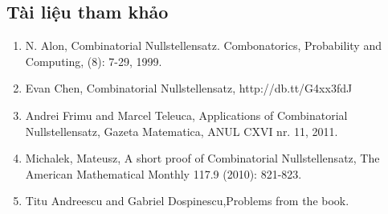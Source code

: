 \subsection*{Tài liệu tham khảo}
\begin{enumerate}[1.]
\item N. Alon, Combinatorial Nullstellensatz. Combonatorics, Probability and Computing, (8): 7-29, 1999.
\item Evan Chen, Combinatorial Nullstellensatz, http://db.tt/G4xx3fdJ
\item Andrei Frimu and Marcel Teleuca, Applications of Combinatorial Nullstellensatz, Gazeta Matematica, ANUL CXVI nr. 11, 2011.
\item Michalek, Mateusz, A short proof of Combinatorial Nullstellensatz, The American Mathematical Monthly 117.9 (2010): 821-823.
\item Titu Andreescu and Gabriel Dospinescu,Problems from the book.
\end{enumerate}


